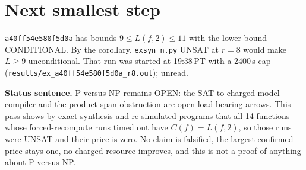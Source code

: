 \documentclass[11pt]{article}
\begin{document}
\section*{Next smallest step}
\texttt{a40ff54e580f5d0a} has bounds $9\le L(f,2)\le 11$ with the lower bound CONDITIONAL. By the corollary, \texttt{exsyn\_n.py} UNSAT at $r=8$ would make $L\ge 9$ unconditional. That run was started at 19:38\,PT with a 2400\,s cap (\texttt{results/ex\_a40ff54e580f5d0a\_r8.out}); unread.

\bigskip
\noindent\textbf{Status sentence.} P versus NP remains OPEN: the SAT-to-charged-model compiler and the product-span obstruction are open load-bearing arrows. This pass shows by exact synthesis and re-simulated programs that all 14 functions whose forced-recompute runs timed out have $C(f)=L(f,2)$, so those runs were UNSAT and their price is zero. No claim is falsified, the largest confirmed price stays one, no charged resource improves, and this is not a proof of anything about P versus NP.
\end{document}
